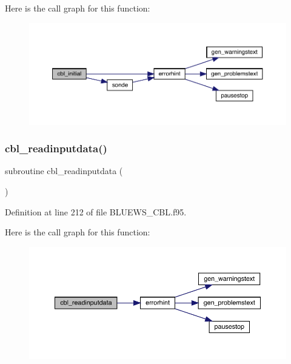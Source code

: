 Here is the call graph for this function\+:\nopagebreak
\begin{figure}[H]
\begin{center}
\leavevmode
\includegraphics[width=350pt]{_b_l_u_e_w_s___c_b_l_8f95_a2070c594a28f66b5ee4b95cd0251621e_cgraph}
\end{center}
\end{figure}
\mbox{\label{_b_l_u_e_w_s___c_b_l_8f95_a2b7c9b5778366f3415268e6939cab229}} 
\subsubsection{\texorpdfstring{cbl\+\_\+readinputdata()}{cbl\_readinputdata()}}
{\footnotesize\ttfamily subroutine cbl\+\_\+readinputdata (\begin{DoxyParamCaption}{ }\end{DoxyParamCaption})}



Definition at line 212 of file B\+L\+U\+E\+W\+S\+\_\+\+C\+B\+L.\+f95.

Here is the call graph for this function\+:\nopagebreak
\begin{figure}[H]
\begin{center}
\leavevmode
\includegraphics[width=350pt]{_b_l_u_e_w_s___c_b_l_8f95_a2b7c9b5778366f3415268e6939cab229_cgraph}
\end{center}
\end{figure}
\mbox{\label{_b_l_u_e_w_s___c_b_l_8f95_ada6e5e5cd6b578659b196bb8c26bd98c}} 
